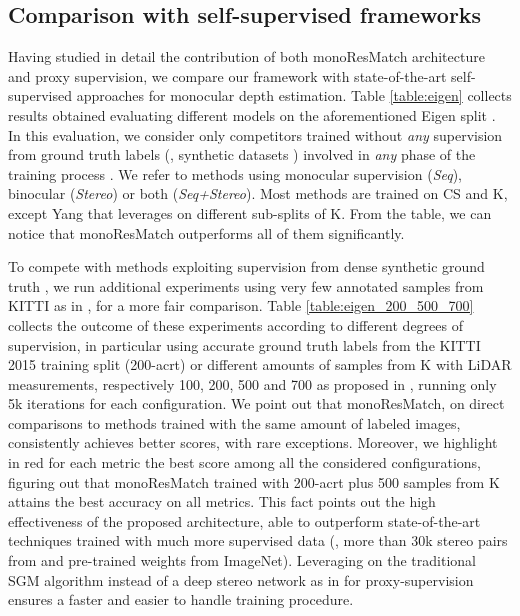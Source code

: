 \documentclass[10pt,twocolumn,letterpaper]{article}
\begin{document}
\subsection{Comparison with self-supervised frameworks}

Having studied in detail the contribution of both monoResMatch architecture and proxy supervision, we compare our framework with state-of-the-art self-supervised approaches for monocular depth estimation.
Table \ref{table:eigen} collects results obtained evaluating different models on the aforementioned Eigen split \cite{eigen2014depth}. In this evaluation, we consider only competitors trained without \emph{any} supervision from ground truth labels (\eg, synthetic datasets \cite{Mayer_2016_CVPR}) involved in \emph{any} phase of the training process \cite{luo2018single,guo2018learning}. We refer to methods using monocular supervision (\textit{Seq}), binocular (\textit{Stereo}) or both (\textit{Seq+Stereo}). Most methods are trained on CS and K, except Yang \etal \cite{yang2018deep} that leverages on different sub-splits of K. From the table, we can notice that monoResMatch outperforms all of them significantly.

To compete with methods exploiting supervision from dense synthetic ground truth \cite{Mayer_2016_CVPR}, we run additional experiments using very few annotated samples from KITTI as in \cite{luo2018supervised,guo2018learning}, for a more fair comparison. Table \ref{table:eigen_200_500_700} collects the outcome of these experiments according to different degrees of supervision, in particular using accurate ground truth labels from the KITTI 2015 training split (200-acrt) or different amounts of samples from K with LiDAR measurements, respectively 100, 200, 500 and 700 as proposed in \cite{luo2018supervised,guo2018learning}, running only 5k iterations for each configuration. We point out that monoResMatch, on direct comparisons to methods trained with the same amount of labeled images, consistently achieves better scores, with rare exceptions. Moreover, we highlight in red for each metric the best score among all the considered configurations, figuring out that monoResMatch trained with 200-acrt plus 500 samples from K attains the best accuracy on all metrics. This fact points out the high effectiveness of the proposed architecture, able to outperform state-of-the-art techniques \cite{luo2018single,guo2018learning} trained with much more supervised data (\ie, more than 30k stereo pairs from \cite{Mayer_2016_CVPR} and pre-trained weights from ImageNet). Leveraging on the traditional SGM algorithm instead of a deep stereo network as in \cite{guo2018learning} for proxy-supervision ensures a faster and easier to handle training procedure.
\end{document}
